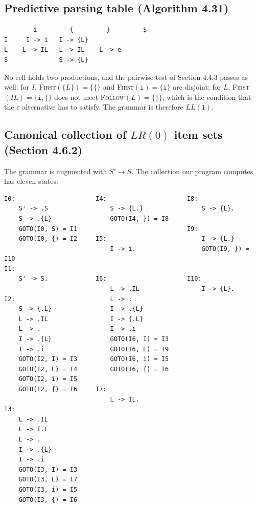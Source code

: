 \documentclass[11pt]{article}
\newcommand{\first}{\textsc{First}}
\newcommand{\follow}{\textsc{Follow}}
\begin{document}
\subsection{Predictive parsing table (Algorithm 4.31)}

\begin{center}
\small
\begin{verbatim}
        i         {         }         $
I     I -> i   I -> {L}
L    L -> IL   L -> IL    L -> e
S              S -> {L}
\end{verbatim}
\end{center}

No cell holds two productions, and the pairwise test of Section 4.4.3 passes as well:
for $I$, \first{}$(\texttt{\{}L\texttt{\}}) = \{\texttt{\{}\}$ and
\first{}$(\texttt{i}) = \{\texttt{i}\}$ are disjoint; for $L$,
\first{}$(IL) = \{\texttt{i},\texttt{\{}\}$ does not meet
\follow{}$(L) = \{\texttt{\}}\}$, which is the condition that the $\varepsilon$
alternative has to satisfy. The grammar is therefore $LL(1)$.

\subsection{Canonical collection of $LR(0)$ item sets (Section 4.6.2)}

The grammar is augmented with $S' \rightarrow S$. The collection our program computes
has eleven states:

\begin{center}
\scriptsize
\begin{verbatim}
I0:                      I4:                      I8:
    S' -> .S                 S -> {L.}                S -> {L}.
    S -> .{L}                GOTO(I4, }) = I8
    GOTO(I0, S) = I1                              I9:
    GOTO(I0, {) = I2     I5:                          I -> {L.}
                             I -> i.                  GOTO(I9, }) = I10
I1:
    S' -> S.             I6:                      I10:
                             L -> .IL                 I -> {L}.
I2:                          L -> .
    S -> {.L}                I -> .{L}
    L -> .IL                 I -> {.L}
    L -> .                   I -> .i
    I -> .{L}                GOTO(I6, I) = I3
    I -> .i                  GOTO(I6, L) = I9
    GOTO(I2, I) = I3         GOTO(I6, i) = I5
    GOTO(I2, L) = I4         GOTO(I6, {) = I6
    GOTO(I2, i) = I5
    GOTO(I2, {) = I6     I7:
                             L -> IL.
I3:
    L -> .IL
    L -> I.L
    L -> .
    I -> .{L}
    I -> .i
    GOTO(I3, I) = I3
    GOTO(I3, L) = I7
    GOTO(I3, i) = I5
    GOTO(I3, {) = I6
\end{verbatim}
\end{center}
\end{document}
